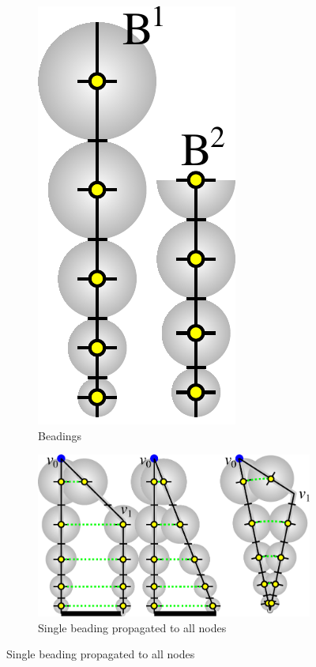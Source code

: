 \begin{figure}
\centering
\setlength{\figheight}{.29\columnwidth}
\begin{subfigure}{0.14\columnwidth}\centering
\includegraphics[height=\figheight]{sources-method-trapezoid-beading-beading.pdf}
\caption{Beadings}\label{trapezoid_beading_beading}
\end{subfigure}
\begin{subfigure}{0.5\columnwidth}\centering
\includegraphics[height=\figheight]{sources-method-trapezoid-beading-propagated.pdf}
\caption{Single beading propagated to all nodes}\label{trapezoid_beading_propagated}

\end{subfigure}
\end{figure}
